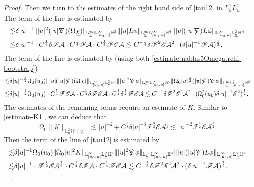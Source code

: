 \documentclass[11pt,reqno]{amsart}
\theoremstyle{definition}
\numberwithin{equation}{section}
\renewcommand{\L}{\mathbb{L}}
\renewcommand{\H}{\mathbb{H}}
\def\chib{\underline{\chi}}
\def\ub{\underline{u}}
\def\nablas{\mbox{$\nabla \mkern -13mu /$ }}
\begin{document}
\begin{proof}
Then we turn to the estimates of the right hand side of \eqref{tau12} in $L_{\ub}^1L_u^1$. The  term of the  line is estimated by
\begin{align*}
\lesssim&\delta|u|^{-1}\||u|^2(|u|\nablas)(\Omega\chib)\|_{\L^\infty_{\ub}\L^\infty_{[u_0,u]}\H^3}\||u|L\phi\|_{\L^\infty_{\ub}\L^\infty_{[u_0,u]}\H^4}\||u|(|u|\nablas)L\phi\|_{\L^\infty_{[u_0,u]}\L^2_{\ub}\H^4}\\
\lesssim&\delta|u|^{-1}\cdot C^{\frac{1}{4}}\delta\mathscr{F}\mathcal{A}\cdot C^{\frac{1}{4}}\mathscr{F}\mathcal{A}\cdot C^{\frac{1}{4}}\mathscr{F}\mathscr{E}\mathcal{A}\lesssim C^{-\frac{1}{4}}\delta\mathscr{F}^2\mathscr{E}\mathcal{A}^2\cdot(\delta|u|^{-1}\mathscr{F}\mathcal{A})^{\frac{1}{2}}.
\end{align*}
The  term of the  line is estimated by (using both \eqref{estimate-nablas5Omegatrchi-bootstrap})
\begin{align*}
\lesssim&\delta|u|^{-\frac{3}{2}}\Omega_0(u_0)\||u|(|u|\nablas)(\Omega\chi)\|_{\L^\infty_{[u_0,u]}\L^2_{\ub}\H^4}\||u|^2\nablas\phi\|_{\L^\infty_{\ub}\L^\infty_{[u_0,u]}\H^4}\|\Omega_0|u|^{\frac{3}{2}}(|u|\nablas)\nablas\phi\|_{\L^\infty_{\ub}\L^2_{[u_0,u]}\H^5}\\
\lesssim&\delta|u|^{-\frac{3}{2}}\Omega_0(u_0)\cdot C^{\frac{1}{4}}\mathscr{F}\mathscr{E}\mathcal{A}\cdot C^{\frac{1}{4}}\delta\mathscr{F}\mathscr{E}\mathcal{A}\cdot C^{\frac{1}{4}}\delta^{\frac{1}{2}}\mathscr{F}\mathscr{E}\mathcal{A}\lesssim C^{-1}\delta\mathscr{F}^2\mathscr{E}^2\mathcal{A}^2\cdot(\Omega_0^2(u_0)\delta|u|^{-1}\mathscr{E}^2)^{\frac{1}{2}}.
\end{align*}
The estimates of the remaining terms require an estimate of $K$. Similar to \eqref{estimate-K1}, we can deduce that
\begin{equation}\label{estimate-K2}
\Omega_0\|K\|_{\L^2_{\ub}\H^4(\ub)}\lesssim|u|^{-2}+C^\frac{3}{8}\delta|u|^{-3}\mathscr{F}^{\frac{3}{2}}\mathscr{E}\mathcal{A}^{\frac{3}{2}}\lesssim|u|^{-2}\mathscr{F}^{\frac{1}{2}}\mathscr{E}\mathcal{A}^{\frac{1}{2}}.
\end{equation}
Then the  term of the  line of \eqref{tau12} is estimated by
\begin{align*}
\lesssim&\delta|u|^{-1}\Omega_0(u_0)\|\Omega_0|u|^2K\|_{\L^\infty_{[u_0,u]}\L^2_{\ub}\H^4}\||u|^2\nablas\phi\|_{\L^\infty_{\ub}\L^\infty_{[u_0,u]}\H^4}\||u|(|u|\nablas)L\phi\|_{\L^\infty_{[u_0,u]}\L^2_{\ub}\H^4}\\
\lesssim&\delta|u|^{-1}\cdot \mathscr{F}^{\frac{1}{2}}\mathscr{E}\mathcal{A}^{\frac{1}{2}}\cdot C^{\frac{1}{4}}\delta\mathscr{F}\mathcal{A}\cdot C^{\frac{1}{4}}\mathscr{F}\mathscr{E}\mathcal{A}\lesssim C^{-\frac{1}{2}}\delta\mathscr{F}^2\mathscr{E}^2\mathcal{A}^2\cdot(\delta|u|^{-1}\mathscr{F}\mathcal{A})^{\frac{1}{2}}.

\end{align*}
\end{proof}
\end{document}
